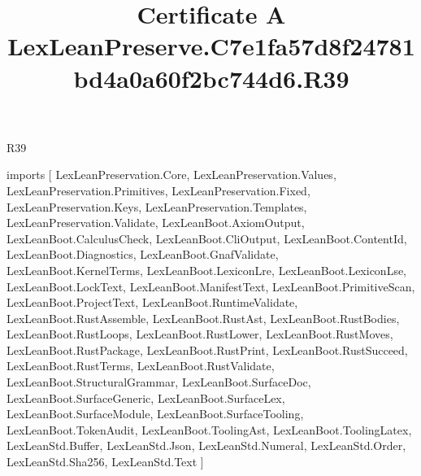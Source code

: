 \begin{lexlean}{R39}
\title{Certificate A LexLeanPreserve.C7e1fa57d8f24781bd4a0a60f2bc744d6.R39}
\begin{coremodule}
imports [
  LexLeanPreservation.Core,
  LexLeanPreservation.Values,
  LexLeanPreservation.Primitives,
  LexLeanPreservation.Fixed,
  LexLeanPreservation.Keys,
  LexLeanPreservation.Templates,
  LexLeanPreservation.Validate,
  LexLeanBoot.AxiomOutput,
  LexLeanBoot.CalculusCheck,
  LexLeanBoot.CliOutput,
  LexLeanBoot.ContentId,
  LexLeanBoot.Diagnostics,
  LexLeanBoot.GnafValidate,
  LexLeanBoot.KernelTerms,
  LexLeanBoot.LexiconLre,
  LexLeanBoot.LexiconLse,
  LexLeanBoot.LockText,
  LexLeanBoot.ManifestText,
  LexLeanBoot.PrimitiveScan,
  LexLeanBoot.ProjectText,
  LexLeanBoot.RuntimeValidate,
  LexLeanBoot.RustAssemble,
  LexLeanBoot.RustAst,
  LexLeanBoot.RustBodies,
  LexLeanBoot.RustLoops,
  LexLeanBoot.RustLower,
  LexLeanBoot.RustMoves,
  LexLeanBoot.RustPackage,
  LexLeanBoot.RustPrint,
  LexLeanBoot.RustSucceed,
  LexLeanBoot.RustTerms,
  LexLeanBoot.RustValidate,
  LexLeanBoot.StructuralGrammar,
  LexLeanBoot.SurfaceDoc,
  LexLeanBoot.SurfaceGeneric,
  LexLeanBoot.SurfaceLex,
  LexLeanBoot.SurfaceModule,
  LexLeanBoot.SurfaceTooling,
  LexLeanBoot.TokenAudit,
  LexLeanBoot.ToolingAst,
  LexLeanBoot.ToolingLatex,
  LexLeanStd.Buffer,
  LexLeanStd.Json,
  LexLeanStd.Numeral,
  LexLeanStd.Order,
  LexLeanStd.Sha256,
  LexLeanStd.Text
]


\end{coremodule}
\end{lexlean}

